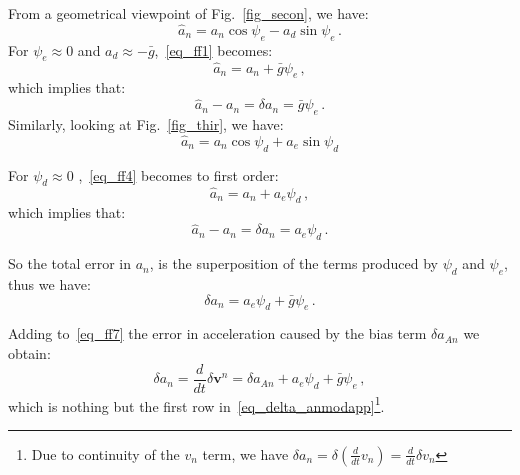 \documentclass[journal]{IEEEtran}
\begin{document}
From  a geometrical viewpoint of Fig.~\ref{fig_secon}, we have:
\begin{equation}\label{eq_ff1}
    \hat{a}_n =a_n \cos\psi_e -a_d\sin\psi_e\,.
\end{equation}
For $\psi_e\approx 0$ and $a_d \approx -\bar g$,~\eqref{eq_ff1} becomes:
\begin{equation}\label{eq_ff2}
    \hat{a}_n =a_n + \bar g\psi_e\,,
\end{equation}
which implies that:
\begin{equation}\label{eq_ff3}
    \hat{a}_n -a_n=\delta a_n= \bar g\psi_e\,.
\end{equation}
Similarly, looking at Fig.~\ref{fig_thir}, we have:
\begin{equation}\label{eq_ff4}
    \hat{a}_n =a_n \cos\psi_d +a_e\sin\psi_d
\end{equation}

For $\psi_d\approx 0$ ,~\eqref{eq_ff4} becomes to first order:
\begin{equation}\label{eq_ff5}
    \hat{a}_n =a_n + a_e\psi_d\,,
\end{equation}
which implies that:
\begin{equation}\label{eq_ff6}
    \hat{a}_n -a_n=\delta a_n= a_e\psi_d\,.
\end{equation}

So the total error in $a_n$, is the superposition of the terms produced by $\psi_d$ and $\psi_e$, thus we have:
\begin{equation}\label{eq_ff7}
    \delta a_n= a_e\psi_d + \bar g\psi_e\,.
\end{equation}

Adding to~\eqref{eq_ff7} the error in acceleration caused by the bias term $\delta a_{An}$ we obtain:
\begin{equation}\label{eq_ff8}
    \delta a_n=\frac{d}{dt}\delta \boldsymbol{v}^n= \delta a_{An} +a_e\psi_d + \bar g\psi_e \,,
\end{equation}
which is nothing but the first row in~\eqref{eq_delta_anmodapp}\footnote{Due to continuity of the $v_n $ term, we have  $\delta a_n= \delta (\frac{d}{dt} v_n)= \frac{d}{dt}\delta v_n$}.
\end{document}
